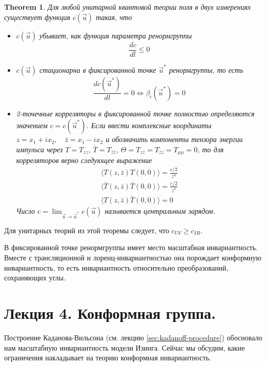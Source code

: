 \documentclass[a4paper,12pt]{article}
\newtheorem{theorem}{Theorem}
\theoremstyle{definition}
\theoremstyle{definition}
\theoremstyle{definition}
\begin{document}
\begin{theorem}
  Для любой унитарной квантовой теории поля в двух измерениях существует функция $c(\vec u)$ такая, что
  \label{c-theorem}
  \begin{itemize}
  \item $c(\vec u)$ убывает, как функция параметра ренормгруппы
    \begin{equation}
      \label{eq:95}
      \frac{dc}{dl}\leq 0
    \end{equation}
  \item $c(\vec u)$ стационарна в фиксированной точке $\vec u^*$ ренормгруппы, то есть
    \begin{equation}
      \label{eq:96}
      \frac{dc({\vec u^*})}{dl}=0 \Leftrightarrow \beta_i(\vec u^*)=0
    \end{equation}
  \item 2-точечные корреляторы в фиксированной точке полностью определяются значением $c=c(\vec u^*)$.
    Если ввести комплексные координаты $z=x_1+ix_2,\quad \bar z=x_1-ix_2$ и обозначить компоненты тензора энергии импульса через $T=T_{zz}$, $\bar T=T_{\bar z\bar z}$, $\Theta=T_{z\bar z}=T_{\bar z z}=T_{\mu\mu}=0$, то для корреляторов верно следующее выражение
    \begin{eqnarray}
      \label{eq:97}
      \langle T(z,\bar z)T(0,0)\rangle=\frac{c/2}{z^4}\\
      \langle \bar T(z,\bar z)\bar T(0,0)\rangle=\frac{c/2}{\bar z^4}\\
      \langle T(z,\bar z) \bar T(0,0)\rangle=0
    \end{eqnarray}
    Число $c=\lim_{\vec u\to \vec u^*} c(\vec u)$ называется центральным зарядом. 
  \end{itemize}
\end{theorem}
Для унитарных теорий из этой теоремы следует, что $c_{UV}\geq c_{IR}$.

В фиксированной точке ренормгруппы имеет место масштабная инвариантность. Вместе с трансляционной и
лоренц-инвариантностью она порождает конформную инвариантность, то есть инвариантность относительно
преобразований, сохраняющих углы. 
\newpage
\section{Лекция 4. Конформная группа.}
\label{sec:lecture-4}

Построение Каданова-Вильсона (см. лекцию \ref{sec:kadanoff-procedure}) обосновало нам масштабную
инвариантность модели Изинга. Сейчас мы обсудим, какие ограничения накладывает на теорию конформная
инвариантность.  
\end{document}
